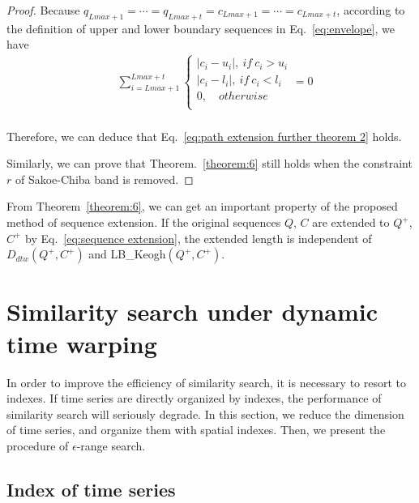 \documentclass[10pt,journal,compsoc]{IEEEtran}
\begin{document}
\begin{proof}
Because $q_{Lmax+1}=\cdots=q_{Lmax+t}=c_{Lmax+1}=\cdots=c_{Lmax+t}$,
according to the definition of upper and lower boundary sequences in Eq.~\eqref{eq:envelope},
we have
\begin{equation}\label{eq:path extension further proof 6}
\begin{split}
    & \sum\limits_{i=Lmax+1}^{Lmax+t}  \left\{ {\begin{array}{l}
      |c_i-u_i|,  \ if \  c_i>u_i \\
      |c_i-l_i|,  \ if \  c_i<l_i \\
      0,  \quad otherwise \\
 \end{array}}  = 0 \right.  \\
\end{split}
\end{equation}




Therefore, we can deduce that Eq.~\eqref{eq:path extension further theorem 2} holds.

Similarly, we can prove that Theorem.~\ref{theorem:6} still holds
when the constraint $r$ of Sakoe-Chiba band is removed.
\end{proof}


From Theorem~\ref{theorem:6},
we can get an important property of the proposed method of sequence extension.
If the original sequences $Q$, $C$ are extended to $Q^+$, $C^+$ by Eq.~\eqref{eq:sequence extension},
the extended length is independent of $D_{dtw}(Q^+,C^+)$ and LB\_Keogh$(Q^+,C^+)$.







\section{Similarity search under dynamic time warping}\label{sec:similarity search}

In order to improve the efficiency of similarity search, it is necessary to resort to indexes.
If time series are directly organized by indexes,
the performance of similarity search will seriously degrade.
In this section, we reduce the dimension of time series,
and organize them with spatial indexes.
Then, we present the procedure of $\epsilon$-range search.


\subsection{Index of time series}\label{sec:index design}
\end{document}
